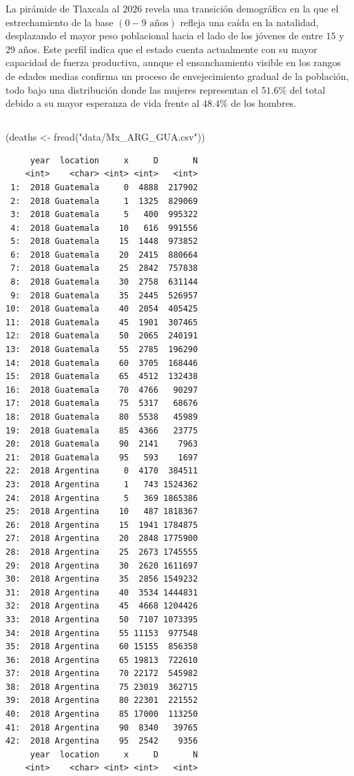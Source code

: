 \documentclass[
  letterpaper,
  DIV=11,
  numbers=noendperiod]{scrartcl}
\newenvironment{Shaded}{\begin{snugshade}}{\end{snugshade}}
\newcommand{\FunctionTok}[1]{\textcolor[rgb]{0.28,0.35,0.67}{#1}}
\newcommand{\NormalTok}[1]{\textcolor[rgb]{0.00,0.23,0.31}{#1}}
\newcommand{\OtherTok}[1]{\textcolor[rgb]{0.00,0.23,0.31}{#1}}
\newcommand{\StringTok}[1]{\textcolor[rgb]{0.13,0.47,0.30}{#1}}
\begin{document}
La pirámide de Tlaxcala al \(2026\) revela una transición demográfica en
la que el estrechamiento de la base \((0-9 \text{ años})\) refleja una
caída en la natalidad, desplazando el mayor peso poblacional hacia el
lado de los jóvenes de entre \(15\) y \(29\) años. Este perfil indica
que el estado cuenta actualmente con su mayor capacidad de fuerza
productiva, aunque el ensanchamiento visible en los rangos de edades
medias confirma un proceso de envejecimiento gradual de la población,
todo bajo una distribución donde las mujeres representan el \(51.6\%\)
del total debido a su mayor esperanza de vida frente al \(48.4\%\) de
los hombres.

\subsection{}\label{section-5}

\begin{Shaded}
\begin{Highlighting}[]
\NormalTok{(deaths }\OtherTok{\textless{}{-}} \FunctionTok{fread}\NormalTok{(}\StringTok{"data/Mx\_ARG\_GUA.csv"}\NormalTok{))}
\end{Highlighting}
\end{Shaded}

\begin{verbatim}
     year  location     x     D       N
    <int>    <char> <int> <int>   <int>
 1:  2018 Guatemala     0  4888  217902
 2:  2018 Guatemala     1  1325  829069
 3:  2018 Guatemala     5   400  995322
 4:  2018 Guatemala    10   616  991556
 5:  2018 Guatemala    15  1448  973852
 6:  2018 Guatemala    20  2415  880664
 7:  2018 Guatemala    25  2842  757838
 8:  2018 Guatemala    30  2758  631144
 9:  2018 Guatemala    35  2445  526957
10:  2018 Guatemala    40  2054  405425
11:  2018 Guatemala    45  1901  307465
12:  2018 Guatemala    50  2065  240191
13:  2018 Guatemala    55  2785  196290
14:  2018 Guatemala    60  3705  168446
15:  2018 Guatemala    65  4512  132438
16:  2018 Guatemala    70  4766   90297
17:  2018 Guatemala    75  5317   68676
18:  2018 Guatemala    80  5538   45989
19:  2018 Guatemala    85  4366   23775
20:  2018 Guatemala    90  2141    7963
21:  2018 Guatemala    95   593    1697
22:  2018 Argentina     0  4170  384511
23:  2018 Argentina     1   743 1524362
24:  2018 Argentina     5   369 1865386
25:  2018 Argentina    10   487 1818367
26:  2018 Argentina    15  1941 1784875
27:  2018 Argentina    20  2848 1775900
28:  2018 Argentina    25  2673 1745555
29:  2018 Argentina    30  2620 1611697
30:  2018 Argentina    35  2856 1549232
31:  2018 Argentina    40  3534 1444831
32:  2018 Argentina    45  4668 1204426
33:  2018 Argentina    50  7107 1073395
34:  2018 Argentina    55 11153  977548
35:  2018 Argentina    60 15155  856358
36:  2018 Argentina    65 19813  722610
37:  2018 Argentina    70 22172  545982
38:  2018 Argentina    75 23019  362715
39:  2018 Argentina    80 22301  221552
40:  2018 Argentina    85 17000  113250
41:  2018 Argentina    90  8340   39765
42:  2018 Argentina    95  2542    9356
     year  location     x     D       N
    <int>    <char> <int> <int>   <int>
\end{verbatim}
\end{document}
